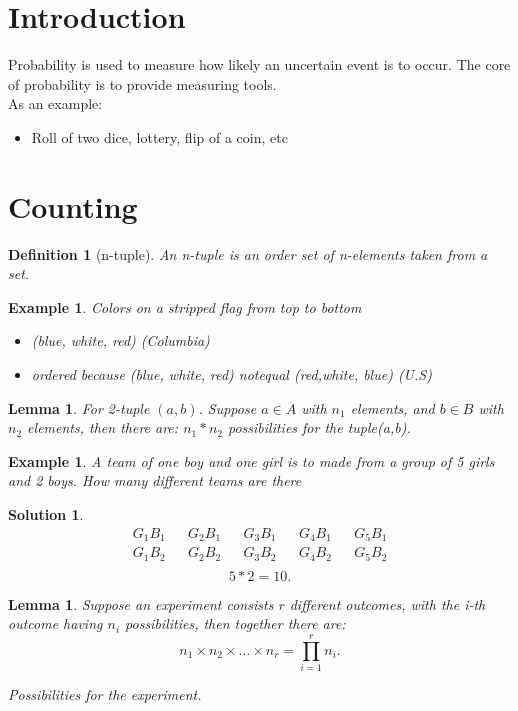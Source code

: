 \documentclass[a4paper]{article}
\newcounter{counter}
\numberwithin{counter}{subsection}
\theoremstyle{break}
\newtheorem{definition}{Definition}
\newtheorem{exmp}[counter]{Example}
\newtheorem{lemma}[counter]{Lemma}
\newtheorem*{solution}{Solution}
\begin{document}
	\section{Introduction}%
    	Probability is used to measure how likely an uncertain event is to occur. The core of probability is to provide measuring tools.\\ 
		As an example:
		\begin{itemize}
			\item Roll of two dice, lottery, flip of a coin, etc
		\end{itemize}
	\section{Counting}%
		\begin{definition}[n-tuple]
			An n-tuple is an order set of n-elements taken from a set.
		\end{definition}

		\begin{exmp}
			Colors on a stripped flag from top to bottom
			\begin{itemize}
				\item (blue, white, red) (Columbia)
				\item ordered because (blue, white, red) notequal (red,white, blue) (U.S)	
			\end{itemize}	
		\end{exmp}

		\begin{lemma}
			For 2-tuple $(a,b)$. Suppose $a \in A$ with $n_1$ elements, and $b \in B$ with $n_2$ elements, then there are: $n_1 * n_2$ possibilities for the tuple(a,b).
		\end{lemma}

		\begin{exmp}
			A team of one boy and one girl is to made from a group of 5 girls and 2 boys. How many different teams are there
		\end{exmp}

		\begin{solution}
			\begin{align*}
				G_1 B_1 && G_2 B_1 && G_3 B_1 && G_4 B_1 && G_5 B_1 \\
				G_1 B_2 && G_2 B_2 && G_3 B_2 && G_4 B_2 && G_5 B_2\\
			\end{align*}
						\[ 5 * 2 = 10 .\] 	
		\end{solution}

		\begin{lemma}
			Suppose an experiment consists $r$ different outcomes, with the i-th outcome having $n_i$ possibilities, then together there are: \[
				n_1 \times n_2 \times \ldots \times n_r = \prod_{i=1}^{r} n_i 
			.\] 

			Possibilities for the experiment.
		\end{lemma}
\end{document}

